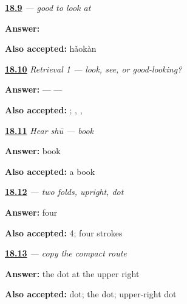 \noindent\begin{minipage}[t]{\linewidth}
\raggedright
\hyperlink{review-ZH-C18-haokan-write}{\textbf{18.9}} \emph{ — good to look at}\par
\small \textbf{Answer:} \par
\footnotesize \textbf{Also accepted:}  hǎokàn
\end{minipage}\par\medskip

\noindent\begin{minipage}[t]{\linewidth}
\raggedright
\hyperlink{review-ZH-R18-looking-three-r1-order}{\textbf{18.10}} \emph{Retrieval 1 — look, see, or good-looking?}\par
\small \textbf{Answer:}  —  — \par
\footnotesize \textbf{Also accepted:}   ; , , 
\end{minipage}\par\medskip

\noindent\begin{minipage}[t]{\linewidth}
\raggedright
\hyperlink{review-ZH-C18-hear-shu-meaning}{\textbf{18.11}} \emph{Hear \emph{shū} — book}\par
\small \textbf{Answer:} book\par
\footnotesize \textbf{Also accepted:} a book
\end{minipage}\par\medskip

\noindent\begin{minipage}[t]{\linewidth}
\raggedright
\hyperlink{review-ZH-W18-shu-observe-count}{\textbf{18.12}} \emph{ — two folds, upright, dot}\par
\small \textbf{Answer:} four\par
\footnotesize \textbf{Also accepted:} 4; four strokes
\end{minipage}\par\medskip

\noindent\begin{minipage}[t]{\linewidth}
\raggedright
\hyperlink{review-ZH-W18-shu-guided-last}{\textbf{18.13}} \emph{ — copy the compact route}\par
\small \textbf{Answer:} the dot at the upper right\par
\footnotesize \textbf{Also accepted:} dot; the dot; upper-right dot
\end{minipage}\par\medskip


